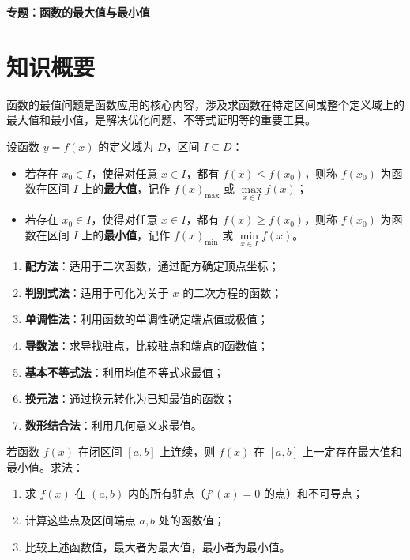 \documentclass[11pt]{ctexrep}
\begin{document}
\begin{center}
    {\LARGE\bfseries 专题：函数的最大值与最小值}
\end{center}

\section*{知识概要}

函数的最值问题是函数应用的核心内容，涉及求函数在特定区间或整个定义域上的最大值和最小值，是解决优化问题、不等式证明等的重要工具。

\begin{definition}[最大值与最小值]
    设函数 $y = f(x)$ 的定义域为 $D$，区间 $I \subseteq D$：
    \begin{itemize}
        \item 若存在 $x_0 \in I$，使得对任意 $x \in I$，都有 $f(x) \leq f(x_0)$，则称 $f(x_0)$ 为函数在区间 $I$ 上的\textbf{最大值}，记作 $f(x)_{\max}$ 或 $\max\limits_{x \in I} f(x)$；
        \item 若存在 $x_0 \in I$，使得对任意 $x \in I$，都有 $f(x) \geq f(x_0)$，则称 $f(x_0)$ 为函数在区间 $I$ 上的\textbf{最小值}，记作 $f(x)_{\min}$ 或 $\min\limits_{x \in I} f(x)$。
    \end{itemize}
\end{definition}

\begin{property}[求最值的基本方法]
    \begin{enumerate}
        \item \textbf{配方法}：适用于二次函数，通过配方确定顶点坐标；
        \item \textbf{判别式法}：适用于可化为关于 $x$ 的二次方程的函数；
        \item \textbf{单调性法}：利用函数的单调性确定端点值或极值；
        \item \textbf{导数法}：求导找驻点，比较驻点和端点的函数值；
        \item \textbf{基本不等式法}：利用均值不等式求最值；
        \item \textbf{换元法}：通过换元转化为已知最值的函数；
        \item \textbf{数形结合法}：利用几何意义求最值。
    \end{enumerate}
\end{property}

\begin{property}[闭区间上连续函数的最值]
    若函数 $f(x)$ 在闭区间 $[a, b]$ 上连续，则 $f(x)$ 在 $[a, b]$ 上一定存在最大值和最小值。求法：
    \begin{enumerate}
        \item 求 $f(x)$ 在 $(a, b)$ 内的所有驻点（$f'(x) = 0$ 的点）和不可导点；
        \item 计算这些点及区间端点 $a, b$ 处的函数值；
        \item 比较上述函数值，最大者为最大值，最小者为最小值。
    \end{enumerate}
\end{property}
\end{document}
